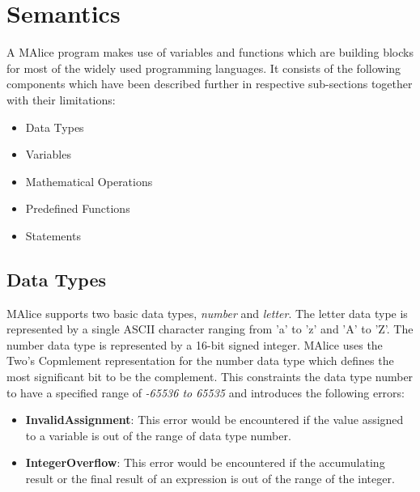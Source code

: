 \documentclass[a4wide, 11pt]{article}
\begin{document}
\section{Semantics}
\label{sec:semantics}
	A MAlice program makes use of variables and functions which are building blocks for most of the widely used programming
	languages. It consists of the following components which have been described further in respective sub-sections
	together with their limitations:
	\begin{itemize}
		\item Data Types
		\item Variables 
		\item Mathematical Operations 
		\item Predefined Functions
		\item Statements
	\end{itemize}
	

	\subsection{Data Types}
	\label{sec:dtypes}		
		MAlice supports two basic data types, \emph{number} and \emph{letter}. The letter 
		data type is represented by a single ASCII character ranging from 'a' to 'z' and 
		'A' to 'Z'. The number data type is represented by a 16-bit signed integer. MAlice uses the 
		Two's Copmlement representation for the number data type which defines
		the most significant bit to be the complement. This constraints the data type number 
		to have a specified range of \emph{-65536 to 65535} and introduces the following errors: 

			\begin{itemize}
				\item {\bf InvalidAssignment}: This error would be encountered if the value assigned to a variable
							is out of the range of data type number.
				\item {\bf IntegerOverflow}: This error would be encountered if the accumulating result or the final result
							of an expression is out of the range of the integer. 
			\end{itemize}
	
\end{document}
